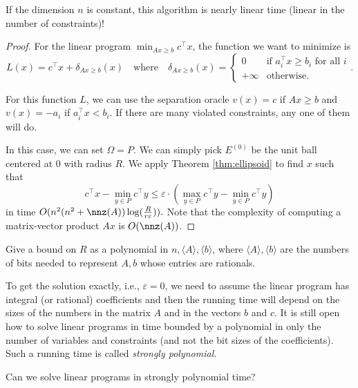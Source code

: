 \begin{rem}
If the dimension $n$ is constant, this algorithm is nearly linear
time (linear in the number of constraints)!
\end{rem}

\begin{proof}
For the linear program $\min_{Ax\geq b}c^{\top}x$, the function we
want to minimize is
\begin{equation}
L(x)=c^{\top}x+\delta_{Ax\geq b}(x)\quad\text{where}\quad\delta_{Ax\geq b}(x)=\begin{cases}
0 & \text{if }a_{i}^{\top}x\geq b_{i}\text{ for all }i\\
+\infty & \text{otherwise.}
\end{cases}.\label{eq:LP_func}
\end{equation}

For this function $L$, we can use the separation oracle $v(x)=c$
if $Ax\geq b$ and $v(x)=-a_{i}$ if $a_{i}^{\top}x<b_{i}$. If there
are many violated constraints, any one of them will do.

In this case, we can set $\Omega=P$. We can simply pick $E^{(0)}$
be the unit ball centered at $0$ with radius $R$. We apply Theorem
\ref{thm:ellipsoid} to find $x$ such that
\[
c^{\top}x-\min_{y\in P}c^{\top}y\leq\varepsilon\cdot(\max_{y\in P}c^{\top}y-\min_{y\in P}c^{\top}y)
\]
in time $O(n^{2}(n^{2}+\nnz(A))\log(\frac{R}{r\varepsilon})).$ Note
that the complexity of computing a matrix-vector product $Ax$ is
$O(\nnz(A))$. 
\end{proof}
\begin{xca}
Give a bound on $R$ as a polynomial in $n,\langle A\rangle,\langle b\rangle$,
where $\langle A\rangle,\langle b\rangle$ are the numbers of bits
needed to represent $A,b$ whose entries are rationals.
\end{xca}

To get the solution exactly, i.e., $\varepsilon=0$, we need to assume
the linear program has integral (or rational) coefficients and then
the running time will depend on the sizes of the numbers in the matrix
$A$ and in the vectors $b$ and $c$. It is still open how to solve
linear programs in time bounded by a polynomial in only the number
of variables and constraints (and not the bit sizes of the coefficients).
Such a running time is called \emph{strongly polynomial. }
\begin{problem*}
Can we solve linear programs in strongly polynomial time?
\end{problem*}

